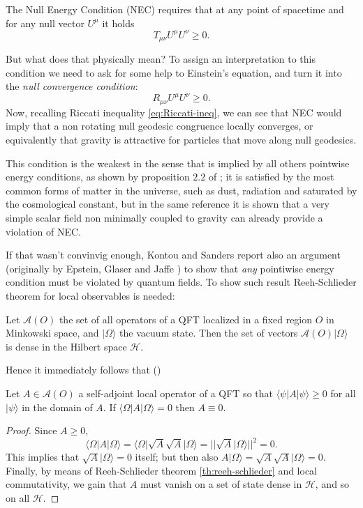 \begin{definition}
    \label{def:NEC}
    The Null Energy Condition (NEC) requires that at any point of spacetime and for any null vector \(U^{\mu}\) it holds
    \[
    T_{\mu\nu}U^{\mu}U^{\nu} \ge 0.
    \]
\end{definition}

But what does that physically mean? To assign an interpretation to this condition we need to ask for some help to Einstein's equation, and turn it into the \emph{null convergence condition}:
\[
    R_{\mu\nu}U^{\mu}U^{\nu} \ge 0. 
\]
Now, recalling Riccati inequality \eqref{eq:Riccati-ineq}, we can see that NEC would imply that a non rotating null geodesic congruence locally converges, or equivalently that gravity is attractive for particles that move along null geodesics.

This condition is the weakest in the sense that is implied by all others pointwise energy conditions, as shown by proposition \(2.2\) of \cite{kontou2020energy}; it is satisfied by the most common forms of matter in the universe, such as dust, radiation and saturated by the cosmological constant, but in the same reference \cite{kontou2020energy} it is shown that a very simple scalar field non minimally coupled to gravity can already provide a violation of NEC.

If that wasn't convinvig enough, Kontou and Sanders report also an argument (originally by Epstein, Glaser and Jaffe \cite{epstein1965nonpositivity}) to show that \emph{any} pointiwise energy condition must be violated by quantum fields. To show such result Reeh-Schlieder theorem for local observables is needed:
\begin{theorem}
    \label{th:reeh-schlieder}
    Let \(\mathcal{A}(O)\) the set of all operators of a QFT localized in a fixed region \(O\) in Minkowski space, and \(\vert \Omega \rangle\) the vacuum state. Then the set of vectors \(\mathcal{A}(O)\vert \Omega \rangle\) is dense in the Hilbert space \(\mathcal{H}\).
\end{theorem}

Hence it immediately follows that (\cite{epstein1965nonpositivity})
\begin{theorem}
    \label{th:quantum-violation-pointwise-conditions}
    Let \(A\in \mathcal{A}(O)\) a self-adjoint local operator of a QFT so that \(\langle \psi\vert A\vert\psi\rangle\ge 0\) for all \(\vert\psi\rangle\) in the domain of \(A\). If \(\langle \Omega\vert A\vert\Omega\rangle = 0\) then \(A \equiv 0\).
\end{theorem}
\begin{proof}
    Since \(A\ge 0\), 
    \[
        \langle \Omega\vert A\vert\Omega\rangle = \langle \Omega\vert \sqrt{A}\sqrt{A}\vert\Omega\rangle = \vert\vert \sqrt{A}\vert\Omega\rangle\vert\vert^2 = 0.
    \] 
    This implies that \(\sqrt{A}\vert\Omega\rangle = 0\) itself; but then also \(A\vert\Omega\rangle = \sqrt{A}\sqrt{A}\vert\Omega\rangle = 0\). Finally, by means of Reeh-Schlieder theorem \ref{th:reeh-schlieder} and local commutativity, we gain that \(A\) must vanish on a set of state dense in \(\mathcal{H}\), and so on all \(\mathcal{H}\).
\end{proof}

